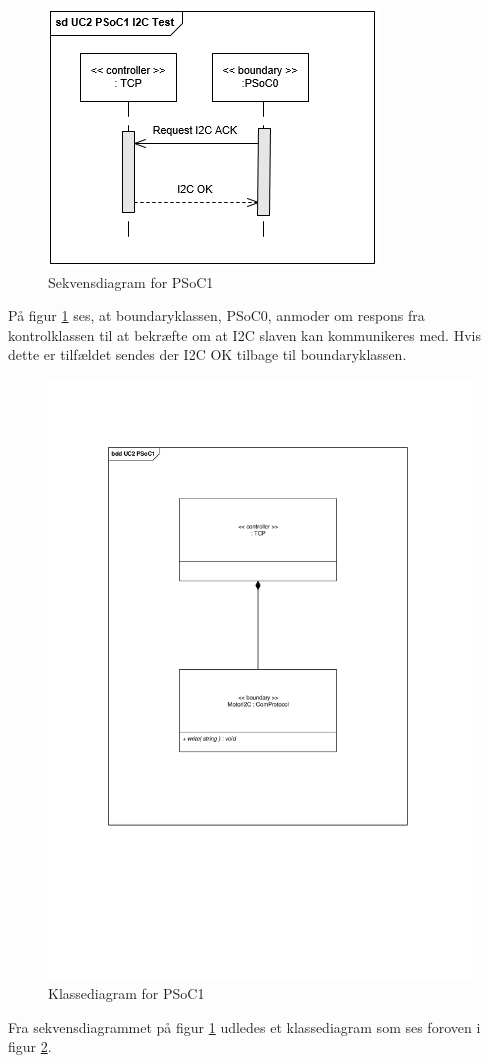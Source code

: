 \begin{figure}[H]
	\centering
	\includegraphics[width=.8\textwidth] {Systemarkitektur/images/SDPSoC1I2CTest}
	\caption{Sekvensdiagram for PSoC1}
	\label{fig:sekvensPSoC1I2CTest}
\end{figure}

På figur \ref{fig:sekvensPSoC1I2CTest} ses, at boundaryklassen, PSoC0, anmoder om respons fra kontrolklassen til at bekræfte om at I2C slaven kan kommunikeres med. Hvis dette er tilfældet sendes der I2C OK tilbage til boundaryklassen.  

\begin{figure}[H]
	\centering
	\includegraphics[width=.5\textwidth]{Systemarkitektur/images/klassediagramPSoC1}
	\caption{Klassediagram for PSoC1}
	\label{fig:klassePSoC1}
\end{figure}

Fra sekvensdiagrammet på figur \ref{fig:sekvensPSoC1I2CTest} udledes et klassediagram som ses foroven i figur \ref{fig:klassePSoC1}.

